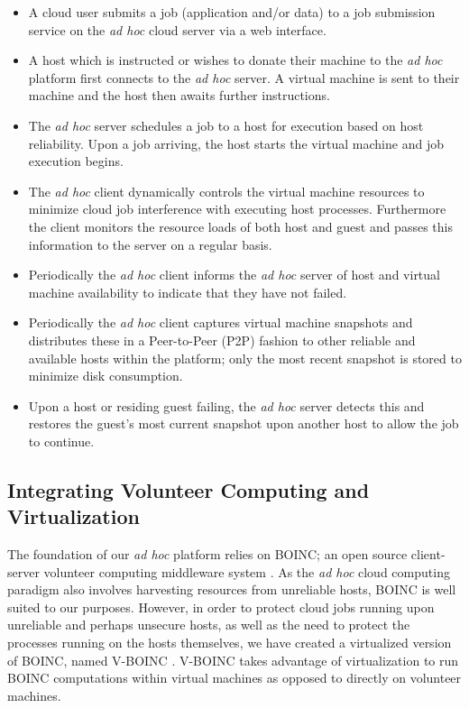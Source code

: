 \documentclass[10pt, conference, compsocconf]{IEEEtran}
\begin{document}
\begin{itemize}
\item A cloud user submits a job (application and/or data) to a job submission service on the \textit{ad hoc} cloud server via a web interface.
\item A host which is instructed or wishes to donate their machine to the \textit{ad hoc} platform first connects to the \textit{ad hoc} server. A virtual machine is sent to their machine and the host then awaits further instructions.
\item The \textit{ad hoc} server schedules a job to a host for execution based on host reliability. Upon a job arriving, the host starts the virtual machine and job execution begins.
\item The \textit{ad hoc} client dynamically controls the virtual machine resources to minimize cloud job interference with executing host processes. Furthermore the client monitors the resource loads of both host and guest and passes this information to the server on a regular basis.
\item Periodically the \textit{ad hoc} client informs the \textit{ad hoc} server of host and virtual machine availability to indicate that they have not failed. 
\item Periodically the \textit{ad hoc} client captures virtual machine snapshots and distributes these in a Peer-to-Peer (P2P) fashion to other reliable and available hosts within the platform; only the most recent snapshot is stored to minimize disk consumption.
\item Upon a host or residing guest failing, the \textit{ad hoc} server detects this and restores the guest's most current snapshot upon another host to allow the job to continue. 
\end{itemize}

\subsection{Integrating Volunteer Computing and Virtualization}
The foundation of our \textit{ad hoc} platform relies on BOINC; an open source client-server volunteer computing middleware system \cite{Anderson2004}. As the \textit{ad hoc} cloud computing paradigm also involves harvesting resources from unreliable hosts, BOINC is well suited to our purposes. However, in order to protect cloud jobs running upon unreliable and perhaps unsecure hosts, as well as the need to protect the processes running on the hosts themselves, we have created a virtualized version of BOINC, named V-BOINC \cite{McGilvary2013}. V-BOINC takes advantage of virtualization to run BOINC computations within virtual machines as opposed to directly on volunteer machines.
\end{document}
